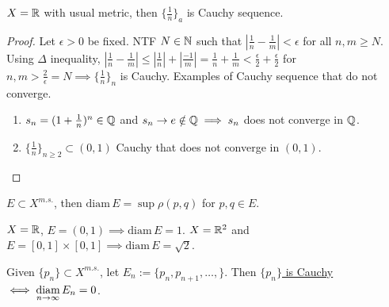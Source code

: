 \documentclass[]{article}
\begin{document}
\begin{example}
	$X = \mathbb{R}$ with usual metric, then $\{\frac{1}{n}\}_a$ is Cauchy sequence.
\end{example}
\begin{proof}
	Let $\epsilon > 0$ be fixed. NTF $N\in\mathbb{N}$ such that $\left|\frac{1}{n}-\frac{1}{m}\right| < \epsilon$ for all $n,m\geq N$.
	Using $\Delta$ inequality, $|\frac{1}{n}-\frac{1}{m}| \leq |\frac{1}{n}| + |\frac{-1}{m}| = \frac{1}{n} + \frac{1}{m} < \frac{\epsilon}{2} + \frac{\epsilon}{2}$ for $n,m>\frac{2}{\epsilon} = N \implies \{\frac{1}{n}\}_n$ is Cauchy.
	Examples of Cauchy sequence that do not converge.
	\begin{enumerate}
		\item $s_n = (1+\frac{1}{n})^n\in\mathbb{Q}$ and $s_n\rightarrow e\notin\mathbb{Q} \implies s_n$ does not converge in $\mathbb{Q}$.
		\item $\{\frac{1}{n}\}_{n\geq 2}\subset(0,1)$ Cauchy that does not converge in $(0,1)$.
	\end{enumerate}
\end{proof}
\begin{definition}
	$E\subset X^{m.s.}$, then $\text{diam}\, E = \sup\rho(p,q)$ for $p,q\in E$.
\end{definition}
\begin{example}
	$X = \mathbb{R}$, $E = (0,1) \implies \text{diam}\, E = 1$. $X = \mathbb{R}^2$ and $E = [0,1]\times [0,1] \implies \text{diam}\, E = \sqrt{2}$.
\end{example}

Given $\{p_n\}\subset X^{m.s.}$, let $E_n := \{p_n,p_{n+1},\dots,\}$. Then \ul{$\{p_n\}$ is Cauchy $\iff \underset{n\rightarrow\infty}{\text{diam}}\, E_n = 0$}.
\end{document}
